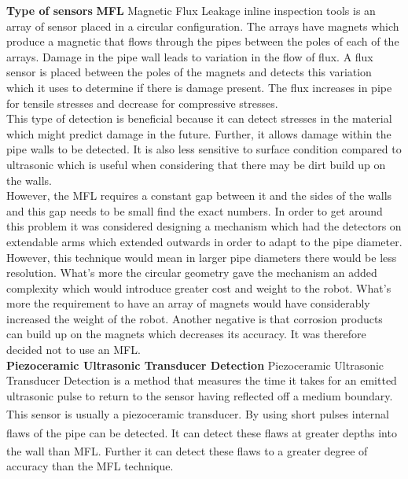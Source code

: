 \documentclass[11pt]{article}		%
\newcommand{\supercite}[1]{\textsuperscript{\cite{#1}}}		%
\begin{document}
	        \textbf{Type of sensors}
	        \textbf{MFL}
	        Magnetic Flux Leakage inline inspection tools is an array of sensor placed in a circular configuration. 
	        The arrays have magnets which produce a magnetic that flows through the pipes between the poles of each of the arrays. 
	        Damage in the pipe wall leads to variation in the flow of flux. 
	        A flux sensor is placed between the poles of the magnets and detects this variation which it uses to determine if there is damage present. 
	        The flux increases in pipe for tensile stresses and decrease for compressive stresses.
	        \\
	        This type of detection is beneficial because it can detect stresses in the material which might predict damage in the future.
	        Further, it allows damage within the pipe walls to be detected. 
	        It is also less sensitive to surface condition compared to ultrasonic which is useful when considering that there may be dirt build up on the walls.
	        \\
	        However, the MFL requires a constant gap between it and the sides of the walls and this gap needs to be small find the exact numbers. 
	        In order to get around this problem it was considered designing a mechanism which had the detectors on extendable arms which extended outwards in order to adapt to the pipe diameter. 
	        However, this technique would mean in larger pipe diameters there would be less resolution. 
	        What’s more the circular geometry gave the mechanism an added complexity which would introduce greater cost and weight to the robot. 
	        What’s more the requirement to have an array of magnets would have considerably increased the weight of the robot. %
	        Another negative is that corrosion products can build up on the magnets which decreases its accuracy. It was therefore decided not to use an MFL.
	        \\
	        \textbf{Piezoceramic Ultrasonic Transducer Detection}
	        Piezoceramic Ultrasonic Transducer Detection is a method that measures the time it takes for an emitted ultrasonic pulse to return to the sensor having reflected off a medium boundary. 
	        This sensor is usually a piezoceramic transducer.\supercite{UT} 
	        By using short pulses internal flaws of the pipe can be detected.\supercite{Corrosion}
	        It can detect these flaws at greater depths into the wall than MFL.\supercite{MFL_Pig} 
	        Further it can detect these flaws to a greater degree of accuracy than the MFL technique. %
\end{document}
